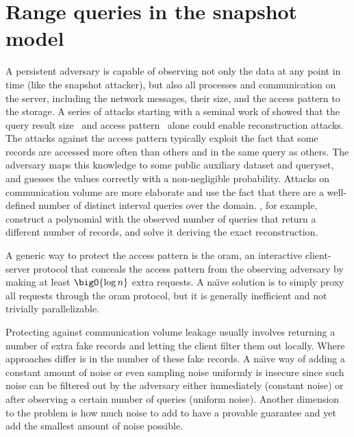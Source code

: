 \chapter{Range queries in the snapshot model}
\thispagestyle{myheadings}

	A persistent adversary is capable of observing not only the data at any point in time (like the snapshot attacker), but also all processes and communication on the server, including the network messages, their size, and the access pattern to the storage.
	A series of attacks starting with a seminal work of \textcite{generic-attacks-kellaris} showed that the query result size~\cite{generic-attacks-kellaris, state-of-uniform, attacks-improved-reconstruction, pump-volume-attacks, volume-range-attacks} and access pattern~\cite{multidimensional-range-queries, inference-attack-islam-14, leakage-abuse-attacks-cash-15, inference-attacks-naveed-15, generic-attacks-kellaris, attacks-tao-of-inference, grubbs-attacks, access-pattern-disclosure, attacks-improved-reconstruction} alone could enable reconstruction attacks.
	The attacks against the access pattern typically exploit the fact that some records are accessed more often than others and in the same query as others.
	The adversary maps this knowledge to some public auxiliary dataset and queryset, and guesses the values correctly with a non-negligible probability.
	Attacks on communication volume are more elaborate and use the fact that there are a well-defined number of distinct interval queries over the domain.
	\textcite{generic-attacks-kellaris}, for example, construct a polynomial with the observed number of queries that return a different number of records, and solve it deriving the exact reconstruction.

	A generic way to protect the access pattern is the \acrfull{oram}, an interactive client-server protocol that conceals the access pattern from the observing adversary by making at least $\bigO{\log n}$ extra requests.
	A na\"{\i}ve solution is to simply proxy all requests through the \acrshort{oram} protocol, but it is generally inefficient and not trivially parallelizable.

	Protecting against communication volume leakage usually involves returning a number of extra fake records and letting the client filter them out locally.
	Where approaches differ is in the number of these fake records.
	A na\"{\i}ve way of adding a constant amount of noise or even sampling noise uniformly is insecure since such noise can be filtered out by the adversary either immediately (constant noise) or after observing a certain number of queries (uniform noise).
	Another dimension to the problem is how much noise to add to have a provable guarantee and yet add the smallest amount of noise possible.

